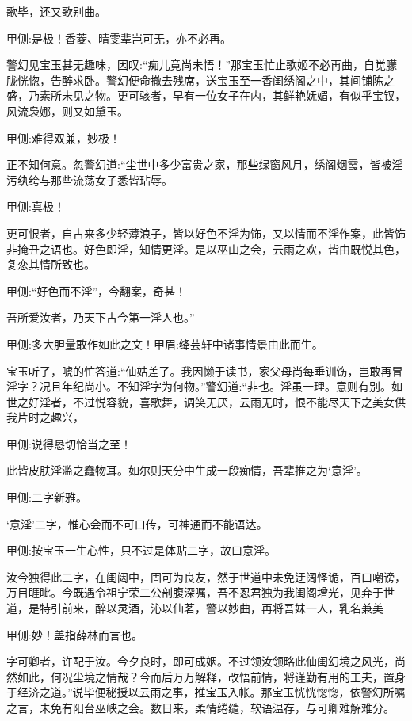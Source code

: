 \begin{parag}
    歌毕，还又歌别曲。\begin{note}甲侧:是极！香菱、晴雯辈岂可无，亦不必再。\end{note}警幻见宝玉甚无趣味，因叹:“痴儿竟尚未悟！”那宝玉忙止歌姬不必再曲，自觉朦胧恍惚，告醉求卧。警幻便命撤去残席，送宝玉至一香闺绣阁之中，其间铺陈之盛，乃素所未见之物。更可骇者，早有一位女子在内，其鲜艳妩媚，有似乎宝钗，风流袅娜，则又如黛玉。\begin{note}甲侧:难得双兼，妙极！\end{note}正不知何意。忽警幻道:“尘世中多少富贵之家，那些绿窗风月，绣阁烟霞，皆被淫污纨绔与那些流荡女子悉皆玷辱。\begin{note}甲侧:真极！\end{note}更可恨者，自古来多少轻薄浪子，皆以好色不淫为饰，又以情而不淫作案，此皆饰非掩丑之语也。好色即淫，知情更淫。是以巫山之会，云雨之欢，皆由既悦其色，复恋其情所致也。\begin{note}甲侧:“好色而不淫”，今翻案，奇甚！\end{note}吾所爱汝者，乃天下古今第一淫人也。”\begin{note}甲侧:多大胆量敢作如此之文！甲眉:绛芸轩中诸事情景由此而生。\end{note}宝玉听了，唬的忙答道:“仙姑差了。我因懒于读书，家父母尚每垂训饬，岂敢再冒淫字？况且年纪尚小。不知淫字为何物。”警幻道:“非也。淫虽一理。意则有别。如世之好淫者，不过悦容貌，喜歌舞，调笑无厌，云雨无时，恨不能尽天下之美女供我片时之趣兴，\begin{note}甲侧:说得恳切恰当之至！\end{note}此皆皮肤淫滥之蠢物耳。如尔则天分中生成一段痴情，吾辈推之为‘意淫’。\begin{note}甲侧:二字新雅。\end{note}‘意淫’二字，惟心会而不可口传，可神通而不能语达。\begin{note}甲侧:按宝玉一生心性，只不过是体贴二字，故曰意淫。\end{note}汝今独得此二字，在闺闼中，固可为良友，然于世道中未免迂阔怪诡，百口嘲谤，万目睚眦。今既遇令祖宁荣二公剖腹深嘱，吾不忍君独为我闺阁增光，见弃于世道，是特引前来，醉以灵酒，沁以仙茗，警以妙曲，再将吾妹一人，乳名兼美\begin{note}甲侧:妙！盖指薛林而言也。\end{note}字可卿者，许配于汝。今夕良时，即可成姻。不过领汝领略此仙闺幻境之风光，尚然如此，何况尘境之情哉？今而后万万解释，改悟前情，将谨勤有用的工夫，置身于经济之道。”说毕便秘授以云雨之事，推宝玉入帐。那宝玉恍恍惚惚，依警幻所嘱之言，未免有阳台巫峡之会。数日来，柔情绻缱，软语温存，与可卿难解难分。
\end{parag}


